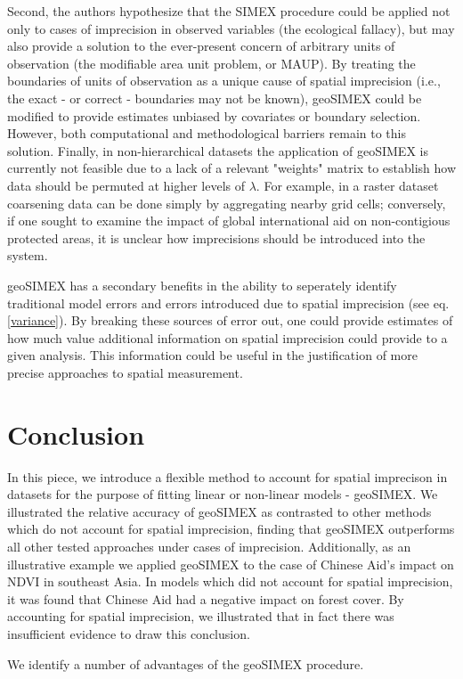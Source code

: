 Second, the authors hypothesize that the SIMEX procedure could be applied not only to cases of imprecision in observed variables (the ecological fallacy), but may also provide a solution to the ever-present concern of arbitrary units of observation (the modifiable area unit problem, or MAUP).
By treating the boundaries of units of observation as a unique cause of spatial imprecision (i.e., the exact - or correct - boundaries may not be known), geoSIMEX could be modified to provide estimates unbiased by covariates or boundary selection.
However, both computational and methodological barriers remain to this solution.
Finally, in non-hierarchical datasets the application of geoSIMEX is currently not feasible due to a lack of a relevant "weights" matrix to establish how data should be permuted at higher levels of $\lambda$.
For example, in a raster dataset coarsening data can be done simply by aggregating nearby grid cells; conversely, if one sought to examine the impact of global international aid on non-contigious protected areas, it is unclear how imprecisions should be introduced into the system.
\par
geoSIMEX has a secondary benefits in the ability to seperately identify traditional model errors and errors introduced due to spatial imprecision (see eq. \ref{variance}).
By breaking these sources of error out, one could provide estimates of how much value additional information on spatial imprecision could provide to a given analysis.
This information could be useful in the justification of more precise approaches to spatial measurement.
\newpage

\section{Conclusion}
In this piece, we introduce a flexible method to account for spatial imprecison in datasets for the purpose of fitting linear or non-linear models - geoSIMEX.
We illustrated the relative accuracy of geoSIMEX as contrasted to other methods which do not account for spatial imprecision, finding that geoSIMEX outperforms all other tested approaches under cases of imprecision.
Additionally, as an illustrative example we applied geoSIMEX to the case of Chinese Aid's impact on NDVI in southeast Asia.  
In models which did not account for spatial imprecision, it was found that Chinese Aid had a negative impact on forest cover.
By accounting for spatial imprecision, we illustrated that in fact there was insufficient evidence to draw this conclusion.
\par
We identify a number of advantages of the geoSIMEX procedure.  



